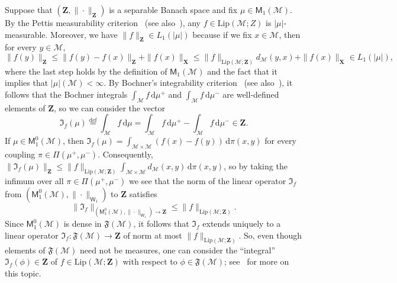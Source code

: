 \documentclass[11pt,reqno]{amsart}
\renewcommand{\le}{\leqslant}
\newcommand{\ud}[0]{\,\mathrm{d}}
\newcommand{\X}{\mathbf X}
\theoremstyle{remark}
\newcommand{\MM}{\mathcal{M}}
\newcommand{\W}{\mathsf{W}}
\newcommand{\eqdef}{\stackrel{\mathrm{def}}{=}}
\newcommand{\Lip}{\mathrm{Lip}}
\newcommand{\bfZ}{\mathbf{Z}}
\renewcommand{\1}{\mathbf 1}
\begin{document}
Suppose that $(\bfZ,\|\cdot\|_\bfZ)$ is a separable Banach space and fix $\mu\in \mathsf{M}_1(\MM)$. By the Pettis measurability criterion~\cite{Pet38} (see also~\cite[Proposition~5.1]{BL00}), any $f\in \Lip(\MM;Z)$ is $|\mu|$-measurable. Moreover, we have $\|f\|_\bfZ\in L_1(|\mu|)$ because if we fix $x\in \MM$, then for every $y\in \MM$, $$\|f(y)\|_\bfZ\le \|f(y)-f(x)\|_\bfZ+\|f(x)\|_{\X}\le \|f\|_{\Lip(\MM;\bfZ)}d_\MM(y,x)+\|f(x)\|_{\X}\in L_1(|\mu|),$$
where the last step holds by the definition of $\mathsf{M}_1(\MM)$ and the fact that it implies that $|\mu|(\MM)<\infty$.  By Bochner's integrability criterion~\cite{Boc33} (see also~\cite[Proposition~5.2]{BL00}), it follows  that the Bochner integrals $\int_\MM f\ud\mu^+$ and $\int_\MM f\ud\mu^-$ are well-defined elements of $\bfZ$, so we can consider  the vector
\begin{equation}\label{eq:def If}
\mathfrak{I}_{\!f}(\mu)\eqdef \int_\MM f\ud \mu=\int_\MM f\ud\mu^+-\int_\MM f\ud\mu^-\in \bfZ.
\end{equation}
 If $\mu\in \mathsf{M}_1^0(\MM)$, then $\mathfrak{I}_{\! f}(\mu)=\int_{\MM\times \MM} (f(x)-f(y))\ud \pi(x,y)$ for every coupling $\pi\in \Pi(\mu^+,\mu^-)$. Consequently, $\|\mathfrak{I}_{\! f}(\mu)\|_\bfZ\le \|f\|_{\Lip(\MM;\bfZ)}\int_{\MM\times \MM} d_\MM(x,y)\ud \pi(x,y)$, so by taking the infimum over all $\pi\in \Pi(\mu^+,\mu^-)$ we see that the norm of the linear operator $\mathfrak{I}_{\! f}$ from  $(\mathsf{M}_1^0(\MM),\|\cdot\|_{\W_1})$ to $\bfZ$ satisfies
 \begin{equation}\label{eq:norm of integral}
 \|\mathfrak{I}_{\! f}\|_{(\mathsf{M}_1^0(\MM),\|\cdot\|_{\W_1})\to \bfZ}\le \|f\|_{\Lip(\MM;\bfZ)}.
 \end{equation}
Since $\mathsf{M}_1^0(\MM)$ is dense in $\mathfrak{F}(\MM)$, it follows that $\mathfrak{I}_{\! f}$ extends uniquely to a linear operator $\mathfrak{I}_{\! f}:\mathfrak{F}(\MM)\to \bfZ$ of norm at most $\|f\|_{\Lip(\MM;\bfZ)}$. So, even though elements of $\mathfrak{F}(\MM)$ need not be measures, one can consider the ``integral'' $\mathfrak{I}_{\! f}(\phi)\in \bfZ$ of $f\in \Lip(\MM;\bfZ)$ with respect to $\phi\in \mathfrak{F}(\MM)$; see~\cite{GK03} for more on this topic.
\end{document}
